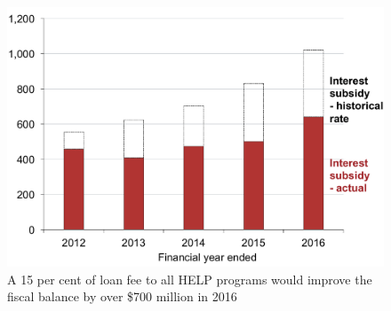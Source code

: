\documentclass[embargoed]{grattan}
\begin{document}
\begin{figure}
\caption{A 15 per cent of loan fee to all HELP programs would improve the fiscal balance by over \$700 million in 2016}\label{fig:fig24-a-15pc-loan-fee-all-HELP-progs-would-improve-fisc-bal-by-over-700M-in-2016}


\includegraphics[page=24]{atlas/Chartpack.pdf}

\end{figure}

\glsaddall
\printglossaries
\end{document}
